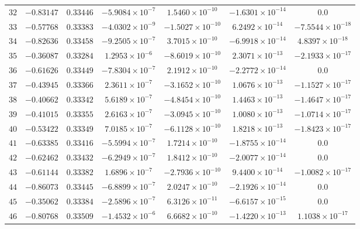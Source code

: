 \begin{landscape}
\begin{center}
\begin{longtable}{lcccccc}
$32$ & $-0.83147$ & $0.33446$ & $-5.9084\times{}10^{-7}$ & $1.5460\times{}10^{-10}$ & $-1.6301\times{}10^{-14}$ & $0.0$ \\
$33$ & $-0.57768$ & $0.33383$ & $-4.0302\times{}10^{-9}$ & $-1.5027\times{}10^{-10}$ & $6.2492\times{}10^{-14}$ & $-7.5544\times{}10^{-18}$ \\
$34$ & $-0.82636$ & $0.33458$ & $-9.2505\times{}10^{-7}$ & $3.7015\times{}10^{-10}$ & $-6.9918\times{}10^{-14}$ & $4.8397\times{}10^{-18}$ \\
$35$ & $-0.36087$ & $0.33284$ & $1.2953\times{}10^{-6}$ & $-8.6019\times{}10^{-10}$ & $2.3071\times{}10^{-13}$ & $-2.1933\times{}10^{-17}$ \\
$36$ & $-0.61626$ & $0.33449$ & $-7.8304\times{}10^{-7}$ & $2.1912\times{}10^{-10}$ & $-2.2772\times{}10^{-14}$ & $0.0$ \\
$37$ & $-0.43945$ & $0.33366$ & $2.3611\times{}10^{-7}$ & $-3.1652\times{}10^{-10}$ & $1.0676\times{}10^{-13}$ & $-1.1527\times{}10^{-17}$ \\
$38$ & $-0.40662$ & $0.33342$ & $5.6189\times{}10^{-7}$ & $-4.8454\times{}10^{-10}$ & $1.4463\times{}10^{-13}$ & $-1.4647\times{}10^{-17}$ \\
$39$ & $-0.41015$ & $0.33355$ & $2.6163\times{}10^{-7}$ & $-3.0945\times{}10^{-10}$ & $1.0080\times{}10^{-13}$ & $-1.0714\times{}10^{-17}$ \\
$40$ & $-0.53422$ & $0.33349$ & $7.0185\times{}10^{-7}$ & $-6.1128\times{}10^{-10}$ & $1.8218\times{}10^{-13}$ & $-1.8423\times{}10^{-17}$ \\
$41$ & $-0.63385$ & $0.33416$ & $-5.5994\times{}10^{-7}$ & $1.7214\times{}10^{-10}$ & $-1.8755\times{}10^{-14}$ & $0.0$ \\
$42$ & $-0.62462$ & $0.33432$ & $-6.2949\times{}10^{-7}$ & $1.8412\times{}10^{-10}$ & $-2.0077\times{}10^{-14}$ & $0.0$ \\
$43$ & $-0.61144$ & $0.33382$ & $1.6896\times{}10^{-7}$ & $-2.7936\times{}10^{-10}$ & $9.4400\times{}10^{-14}$ & $-1.0082\times{}10^{-17}$ \\
$44$ & $-0.86073$ & $0.33445$ & $-6.8899\times{}10^{-7}$ & $2.0247\times{}10^{-10}$ & $-2.1926\times{}10^{-14}$ & $0.0$ \\
$45$ & $-0.35062$ & $0.33384$ & $-2.5896\times{}10^{-7}$ & $6.3126\times{}10^{-11}$ & $-6.6157\times{}10^{-15}$ & $0.0$ \\
$46$ & $-0.80768$ & $0.33509$ & $-1.4532\times{}10^{-6}$ & $6.6682\times{}10^{-10}$ & $-1.4220\times{}10^{-13}$ & $1.1038\times{}10^{-17}$ \\

\end{longtable}
\end{center}
\end{landscape}
